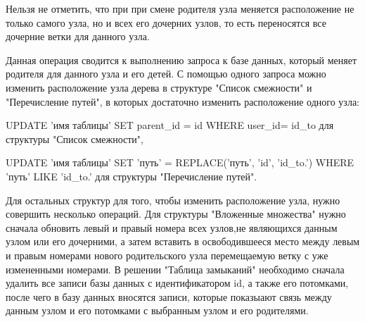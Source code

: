 \documentclass[a4paper,14pt]{extreport}
\theoremstyle{definition}
\begin{document}
Нельзя не отметить, что при при смене родителя узла меняется расположение не только самого узла, но и всех его дочерних узлов, то есть переносятся все дочерние ветки для данного узла.

Данная операция сводится к выполнению запроса к базе данных, который меняет родителя для данного узла и его детей. С помощью одного запроса можно изменить расположение узла дерева в структуре "Список смежности" и "Перечисление путей", в которых достаточно изменить расположение одного узла\cite{Welling}:

UPDATE 'имя таблицы' SET parent\_id = \textdollar id  WHERE user\_id= \textdollar id\_to для структуры "Список смежности",

UPDATE 'имя таблицы' SET
    'путь' = REPLACE('путь', '\textdollar id', '\textdollar id\_to.') WHERE 'путь' LIKE '\textdollar id\_to.' для структуры "Перечисление путей".

Для остальных структур для того, чтобы изменить расположение узла, нужно совершить несколько операций. Для структуры "Вложенные множества" нужно сначала обновить левый и правый номера всех узлов,не являющихся данным узлом или его дочерними, а затем вставить в освободившееся место между левым и правым номерами нового родительского узла перемещаемую ветку с уже измененными номерами. В решении "Таблица замыканий" необходимо сначала удалить все записи базы данных с идентификатором \textdollar id, а также его потомками, после чего в базу данных вносятся записи, которые показыают связь между данным узлом и его потомками с выбранным узлом и его родителями.
\end{document}
